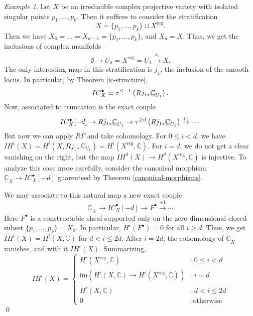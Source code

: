 \documentclass[letterpaper, 12pt]{article}
\newcommand{\C}{\mathbb{C}}
\theoremstyle{definition}
\theoremstyle{remark}
\newtheorem{example}{Example}
\begin{document}
\begin{example}
Let $X$ be an irreducible complex projective variety with isolated singular points $p_1,\dots, p_k$. Then it suffices to consider the stratification
\[ X = \{p_1,\dots,p_k\} \sqcup X^{\text{reg}}. \]
Then we have \(X_0 = \dots = X_{d-1} = \{p_1,\dots, p_k\}\), and \(X_d = X\). Thus, we get the inclusions of complex manifolds
\[ \emptyset \to U_d = X^{\text{reg}} = U_1 \overset{j_1}{\to} X.\]
The only interesting map in this stratification is $j_1$, the inclusion of the smooth locus. In particular, by Theorem \ref{ic-structure},
\[ IC_X^\bullet \simeq \tau^{\leq -1}\paren{Rj_{1*} \underline{\C}_{U_1}}. \] 
Now, associated to truncation is the exact couple
\begin{equation}
    IC_X^\bullet[-d] \to Rj_{1*} \underline{\C}_{U_1} \to 
    \tau^{\geq d}\paren{Rj_{1*} \underline{\C}_{U_1}} \overset{+1}{\to} \cdots
\end{equation}
But now we can apply $R\Gamma$ and take cohomology. For $0 \leq i < d$, we have
\( IH^i(X) = H^i(X, Rj_{1*}\overline{\C}_{U_1}) = H^i(X^{\text{reg}}, \C). \) For $i=d$, we do not get a clear vanishing on the right, but the map
\(IH^d(X) \to H^d(X^{\text{reg}}, \C)\) is injective. To analyze this case more carefully, consider the canonical morphism
\( \underline{\C}_X \to IC_X^\bullet[-d] \)
guarenteed by Theorem \ref{canonical-morphisms}.

We may associate to this natural map a new exact couple
\begin{equation}
    \underline{\C}_X \to IC_X^\bullet[-d] \to F^\bullet \overset{+1}{\to} \cdots
\end{equation}
Here \(F^\bullet\) is a constructable sheaf supported only on the zero-dimensional closed subset $\{p_1, \dots, p_k\} = X_0$. In particular, \(H^i(F^\bullet) = 0\) for all $i \geq d$. Thus, we get \(IH^i(X) = H^i(X, \C)\) for $d < i \leq 2d$. After $i = 2d$, the cohomology of $\underline{\C}_X$ vanishes, and with it $IH^i(X)$. Summarizing,
\begin{equation}
    IH^i(X) = \begin{cases}
        H^i(X^{\text{reg}}, \C) & : 0 \leq i < d \\
        \text{im}(H^i(X, \C) \to H^i(X^{\text{reg}}, \C)) & : i = d \\
        H^i(X, \C) & : d < i \leq 2d \\
        0 & : \text{otherwise}
    \end{cases}
\end{equation}
\qed
\end{example}
\end{document}
